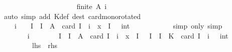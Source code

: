 \begin{isabellebody}
\ \ \ \ \ \ \isamarkupfalse%
\ \isamarkupfalse%
\ {\isachardoublequoteopen}{\isasymdots}\ {\isacharequal}{\kern0pt}\ {\isacharbraceleft}{\kern0pt}{\isacharbraceright}{\kern0pt}{\isachardoublequoteclose}\isanewline
\ \ \ \ \ \ \ \ \isamarkupfalse%
\ {\isacartoucheopen}finite\ A{\isacartoucheclose}\ i\ \isamarkupfalse%
\ {\isacharparenleft}{\kern0pt}auto\ simp\ add{\isacharcolon}{\kern0pt}\ K{\isacharunderscore}{\kern0pt}def\ dest{\isacharcolon}{\kern0pt}\ card{\isacharunderscore}{\kern0pt}mono{\isacharbrackleft}{\kern0pt}rotated\ {}{\isacharbrackright}{\kern0pt}{\isacharparenright}{\kern0pt}\isanewline
\ \ \ \ \ \ \isamarkupfalse%
\ \isamarkupfalse%
\ {\isachardoublequoteopen}{\isacharparenleft}{\kern0pt}{\isacharminus}{\kern0pt}\ {}{\isacharparenright}{\kern0pt}\ {\isacharcircum}{\kern0pt}\ {\isacharparenleft}{\kern0pt}i\ {\isacharplus}{\kern0pt}\ {}{\isacharparenright}{\kern0pt}\ {\isacharasterisk}{\kern0pt}\ {\isacharparenleft}{\kern0pt}{\isasymSum}I\ {\isacharbar}{\kern0pt}\ I\ {\isasymsubseteq}\ A\ {\isasymand}\ card\ I\ {\isacharequal}{\kern0pt}\ i\ {\isasymand}\ x\ {\isasymin}\ {\isasymInter}I{\isachardot}{\kern0pt}\ {}\ {\isacharcolon}{\kern0pt}{\isacharcolon}{\kern0pt}\ int{\isacharparenright}{\kern0pt}\ {\isacharequal}{\kern0pt}\ {}{\isachardoublequoteclose}\isanewline
\ \ \ \ \ \ \ \ \isamarkupfalse%
\ {\isacharparenleft}{\kern0pt}simp\ only{\isacharcolon}{\kern0pt}{\isacharparenright}{\kern0pt}\ simp\isanewline
\ \ \ \ \isamarkupfalse%
\isanewline
\ \ \ \ \ \ \isamarkupfalse%
\ i\isanewline
\ \ \ \ \ \ \isamarkupfalse%
\ {\isachardoublequoteopen}{\isacharparenleft}{\kern0pt}{\isasymSum}I\ {\isacharbar}{\kern0pt}\ I\ {\isasymsubseteq}\ A\ {\isasymand}\ card\ I\ {\isacharequal}{\kern0pt}\ i\ {\isasymand}\ x\ {\isasymin}\ {\isasymInter}I{\isachardot}{\kern0pt}\ {}{\isacharparenright}{\kern0pt}\ {\isacharequal}{\kern0pt}\ {\isacharparenleft}{\kern0pt}{\isasymSum}I\ {\isacharbar}{\kern0pt}\ I\ {\isasymsubseteq}\ K\ {\isasymand}\ card\ I\ {\isacharequal}{\kern0pt}\ i{\isachardot}{\kern0pt}\ {}\ {\isacharcolon}{\kern0pt}{\isacharcolon}{\kern0pt}\ int{\isacharparenright}{\kern0pt}{\isachardoublequoteclose}\isanewline
\ \ \ \ \ \ \ \ {\isacharparenleft}{\kern0pt}\ {\isachardoublequoteopen}{\isacharquery}{\kern0pt}lhs\ {\isacharequal}{\kern0pt}\ {\isacharquery}{\kern0pt}rhs{\isachardoublequoteclose}{\isacharparenright}{\kern0pt}\isanewline

\end{isabellebody}
